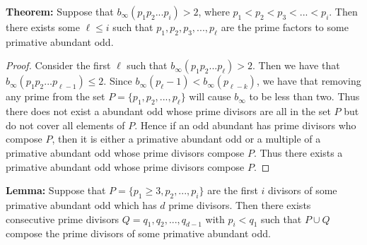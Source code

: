 \documentclass[../paper.tex]{subfiles}
\begin{document}



\textbf{Theorem:} Suppose that $b_{\infty}(p_1 p_2 ... p_i) > 2$,
where $p_1 < p_2 < p_3 < ... < p_i$. Then there exists some 
$\ell \leq i$ such that $p_1, p_2, p_3, ..., p_\ell$ are the prime
factors to some primative abundant odd.

\begin{proof}
	Consider the first $\ell$ such that $b_{\infty}(
p_1 p_2 ... p_\ell) > 2$. Then we have that $b_{\infty}(p_1 p_2 
... p_{\ell - 1}) \leq 2$. Since 
$b_{\infty}(p_\ell - 1) < b_{\infty}(p_{\ell - k})$, we have that
removing any prime from the set $P = \{p_1, p_2, ..., p_{\ell} \}$ will
cause $b_{\infty}$ to be less than two. Thus there does not exist
a abundant odd whose prime divisors are all in the set 
$P$ but do not cover all elements of $P$. Hence if an odd abundant
has prime divisors who compose $P$, then it is either a primative 
abundant odd or a multiple of a primative abundant odd whose prime
divisors compose $P$. Thus there exists a primative abundant odd
whose prime divisors compose $P$.
\end{proof}


\textbf{Lemma:} Suppose that $P = \{ p_1 \geq 3, p_2, ..., p_i\}$ are 
the first $i$ divisors of some primative abundant odd which has
$d$ prime divisors. Then there exists consecutive prime divisors
$Q = q_1, q_2, ..., q_{d - 1}$ with $p_i < q_1$ such that 
$P \cup Q$ compose the prime divisors of some primative abundant 
odd.
\end{document}
